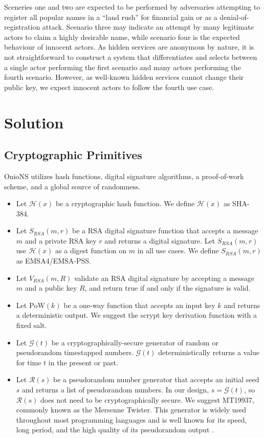 \documentclass[USenglish,oneside,twocolumn]{article}
\begin{document}
Sceneries one and two are expected to be performed by adversaries attempting to register all popular names in a ``land rush'' for financial gain or as a denial-of-registration attack. Scenario three may indicate an attempt by many legitimate actors to claim a highly desirable name, while scenario four is the expected behaviour of innocent actors. As hidden services are anonymous by nature, it is not straightforward to construct a system that differentiates and selects between a single actor performing the first scenario and many actors performing the fourth scenario. However, as well-known hidden services cannot change their public key, we expect innocent actors to follow the fourth use case.

\section{Solution}
\label{sec:Solution}

\subsection{Cryptographic Primitives}
\label{sec:cryptoPrimitives}

OnioNS utilizes hash functions, digital signature algorithms, a proof-of-work scheme, and a global source of randomness.

\begin{itemize}
	\item Let $ \mathcal{H}(x) $ be a cryptographic hash function. We define $ \mathcal{H}(x) $ as SHA-384.
	\item Let $ S_{\mathit{RSA}}(m, r) $ be a RSA digital signature function that accepts a message $ m $ and a private RSA key $ r $ and returns a digital signature. Let $ S_{\mathit{RSA}}(m, r) $ use $ \mathcal{H}(x) $ as a digest function on $ m $ in all use cases. We define $ S_{\mathit{RSA}}(m, r) $ as EMSA4/EMSA-PSS.
	\item Let $ V_{\mathit{RSA}}(m, R) $ validate an RSA digital signature by accepting a message $ m $ and a public key $ R $, and return true if and only if the signature is valid.
	\item Let $ \mathrm{PoW}(k) $ be a one-way function that accepts an input key $ k $ and returns a deterministic output. We suggest the scrypt \cite{percival2012scrypt} key derivation function with a fixed salt.
	\item Let $ \mathcal{G}(t) $ be a cryptographically-secure generator of random or pseudorandom timestapped numbers. $ \mathcal{G}(t) $ deterministically returns a value for time $ t $ in the present or past.
	\item Let $ \mathcal{R}(s) $ be a pseudorandom number generator that accepts an initial seed $ s $ and returns a list of pseudorandom numbers. In our design, $ s = \mathcal{G}(t) $, so $ \mathcal{R}(s) $ does not need to be cryptographically secure. We suggest MT19937, commonly known as the Mersenne Twister. This generator is widely used throughout most programming languages and is well known for its speed, long period, and the high quality of its pseudorandom output \cite{matsumoto1998mersenne}.
\end{itemize}
\end{document}
